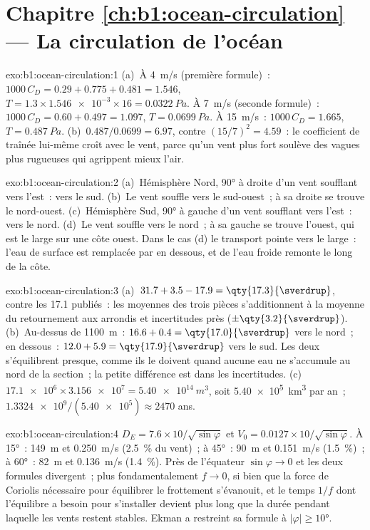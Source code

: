 \section*{Chapitre \ref{ch:b1:ocean-circulation} --- La circulation de l'océan}

\begin{solution}{exo:b1:ocean-circulation:1}
(a)~À \qty{4}{m/s} (première formule)~: $1000\,C_D = 0.29 + 0.775 + 0.481 = 1.546$,
$T = 1.3 \times \num{1.546e-3} \times 16 = \qty{0.0322}{Pa}$. À \qty{7}{m/s}
(seconde formule)~: $1000\,C_D = 0.60 + 0.497 = 1.097$, $T = \qty{0.0699}{Pa}$. À
\qty{15}{m/s}~: $1000\,C_D = 1.665$, $T = \qty{0.487}{Pa}$. (b)~$0.487/0.0699 =
6.97$, contre $(15/7)^2 = 4.59$~: le coefficient de traînée lui-même croît avec le vent,
parce qu'un vent plus fort soulève des vagues plus rugueuses qui agrippent mieux l'air.
\end{solution}

\begin{solution}{exo:b1:ocean-circulation:2}
(a)~Hémisphère Nord, \ang{90} à droite d'un vent soufflant vers l'est~: vers le
sud. (b)~Le vent souffle vers le sud-ouest~; à sa droite se trouve le nord-ouest.
(c)~Hémisphère Sud, \ang{90} à gauche d'un vent soufflant vers l'est~: vers le
nord. (d)~Le vent souffle vers le nord~; à sa gauche se trouve l'ouest, qui est
le large sur une côte ouest. Dans le cas (d) le transport pointe vers le large~: l'eau de surface
est remplacée par en dessous, et de l'eau froide remonte le long de la côte.
\end{solution}

\begin{solution}{exo:b1:ocean-circulation:3}
(a)~$31.7 + 3.5 - 17.9 = \qty{17.3}{\sverdrup}$, contre les
\qty{17.1}{\sverdrup} publiés~: les moyennes des trois pièces s'additionnent à la moyenne du retournement
aux arrondis et incertitudes près ($\pm\qty{3.2}{\sverdrup}$).
(b)~Au-dessus de \qty{1100}{m}~: $16.6 + 0.4 = \qty{17.0}{\sverdrup}$ vers le nord~; en dessous~:
$12.0 + 5.9 = \qty{17.9}{\sverdrup}$ vers le sud. Les deux s'équilibrent presque, comme ils le doivent
quand aucune eau ne s'accumule au nord de la section~; la petite différence est dans les
incertitudes. (c)~$\num{17.1e6} \times \num{3.156e7} = \qty{5.40e14}{m^3}$, soit
\qty{5.40e5}{km^3} par an~; $\num{1.3324e9}/(\num{5.40e5}) \approx 2470$ ans.
\end{solution}

\begin{solution}{exo:b1:ocean-circulation:4}
$D_E = 7.6 \times 10/\sqrt{\sin\varphi}$ et $V_0 = 0.0127 \times
10/\sqrt{\sin\varphi}$. À \ang{15}~: \qty{149}{m} et \qty{0.250}{m/s}
(\qty{2.5}{\percent} du vent)~; à \ang{45}~: \qty{90}{m} et \qty{0.151}{m/s}
(\qty{1.5}{\percent})~; à \ang{60}~: \qty{82}{m} et \qty{0.136}{m/s}
(\qty{1.4}{\percent}). Près de l'équateur $\sin\varphi \to 0$ et les deux formules
divergent~; plus fondamentalement $f \to 0$, si bien que la force de Coriolis nécessaire pour équilibrer
le frottement s'évanouit, et le temps $1/f$ dont l'équilibre a besoin pour s'installer devient plus long
que la durée pendant laquelle les vents restent stables. Ekman a restreint sa formule à $|\varphi| \geq
\ang{10}$.
\end{solution}

